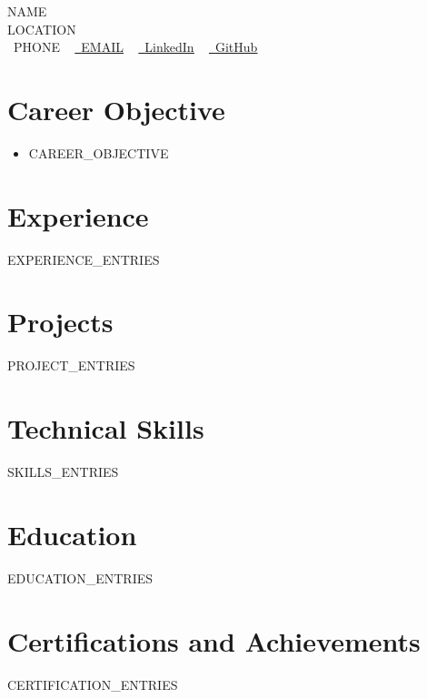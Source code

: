 \documentclass[letterpaper,11pt]{article}
\newcommand{\resumeItem}[1]{
  \item\small{
    {#1 \vspace{-2pt}}
  }
}
\newcommand{\resumeSubHeadingListStart}{\begin{itemize}[leftmargin=0.0in, label={}]}
\newcommand{\resumeSubHeadingListEnd}{\end{itemize}}
\begin{document}
\begin{center}
    {\Huge \scshape {{NAME}}} \\ \vspace{1pt}
    {{LOCATION}} \\ \vspace{1pt}
    \small \raisebox{-0.1\height}\faPhone\ {{PHONE}} ~ 
    \href{mailto:{{EMAIL}}}{\raisebox{-0.2\height}\faEnvelope\ \underline{{{EMAIL}}}} ~ 
    \href{{{LINKEDIN_URL}}}{\raisebox{-0.2\height}\faLinkedin\ \underline{LinkedIn}} ~
    \href{{{GITHUB_URL}}}{\raisebox{-0.2\height}\faGithub\ \underline{GitHub}}
    \vspace{-8pt}
\end{center}

\section{Career Objective}
  \resumeSubHeadingListStart
    \resumeItem{{{CAREER_OBJECTIVE}}}
  \resumeSubHeadingListEnd
\vspace{-16pt}

\section{Experience}
\resumeSubHeadingListStart
{{EXPERIENCE_ENTRIES}}
\resumeSubHeadingListEnd
\vspace{-10pt}

\section{Projects}
\vspace{-5pt}
\resumeSubHeadingListStart
{{PROJECT_ENTRIES}}
\resumeSubHeadingListEnd
\vspace{-15pt}

\section{Technical Skills}
\begin{itemize}[leftmargin=0.15in, label={}]
    \small{\item{
{{SKILLS_ENTRIES}}
    }}
\end{itemize}
\vspace{-16pt}

\section{Education}
\resumeSubHeadingListStart
{{EDUCATION_ENTRIES}}
\resumeSubHeadingListEnd

\section{Certifications and Achievements}
\resumeSubHeadingListStart
{{CERTIFICATION_ENTRIES}}
\resumeSubHeadingListEnd
\vspace{-10pt}
\end{document}
